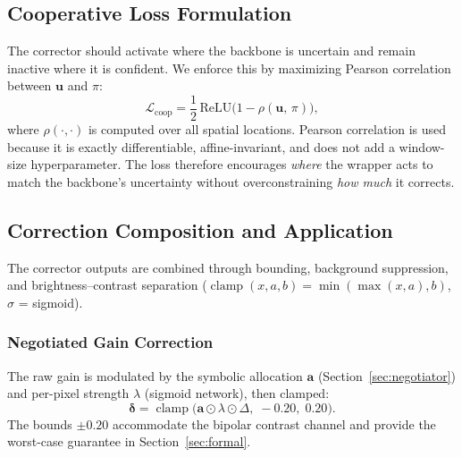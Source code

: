 \documentclass{ieeetj}
\begin{document}
\subsection{Cooperative Loss Formulation}
\label{sec:coop_loss}
The corrector should activate where the backbone is uncertain and remain inactive where it is confident. We enforce this by maximizing Pearson correlation between $\mathbf{u}$ and $\pi$:
\begin{equation}
\mathcal{L}_\text{coop} = \frac{1}{2}\,\text{ReLU}\!\big(1 - \rho(\mathbf{u},\, \pi)\big),
\label{eq:coop_loss}
\end{equation}
where $\rho(\cdot,\cdot)$ is computed over all spatial locations. Pearson correlation is used because it is exactly differentiable, affine-invariant, and does not add a window-size hyperparameter. The loss therefore encourages \emph{where} the wrapper acts to match the backbone's uncertainty without overconstraining \emph{how much} it corrects.

\subsection{Correction Composition and Application}
\label{sec:correction_composition}
The corrector outputs are combined through bounding, background suppression, and brightness--contrast separation ($\operatorname{clamp}(x, a, b) = \min(\max(x, a), b)$, $\sigma$ = sigmoid).

\subsubsection{Negotiated Gain Correction}
The raw gain is modulated by the symbolic allocation $\mathbf{a}$ (Section~\ref{sec:negotiator}) and per-pixel strength $\lambda$ (sigmoid network), then clamped:
\begin{equation}
\boldsymbol{\delta} = \operatorname{clamp}\!\Big(\mathbf{a} \odot \lambda \odot \Delta,\; -0.20,\; 0.20\Big).
\label{eq:composition}
\end{equation}
The bounds $\pm 0.20$ accommodate the bipolar contrast channel and provide the worst-case guarantee in Section~\ref{sec:formal}.
\end{document}
